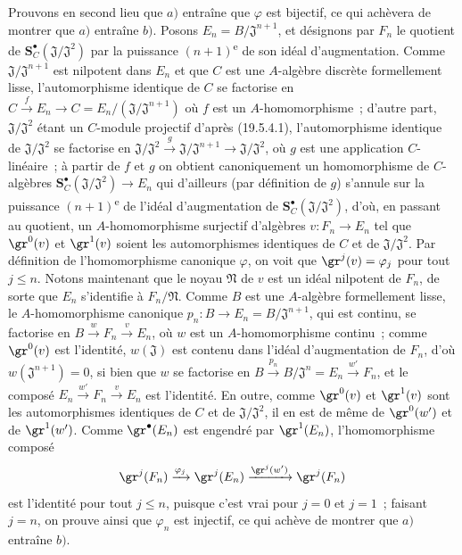\begin{env}[19.5.4.2]
\label{0.19.5.4.2-fr}
Prouvons en second lieu que $a)$ entraîne que $\varphi$ est bijectif, ce qui
achèvera de montrer que $a)$ entraîne $b)$. Posons
$E_n=B/\mathfrak J^{n+1}$, et désignons par $F_n$ le quotient de
$\mathbf S_C^\bullet(\mathfrak J/\mathfrak J^2)$ par la puissance $(n+1)$\textsuperscript{e} de
son idéal d'augmentation. Comme $\mathfrak J/\mathfrak J^{n+1}$ est nilpotent
dans $E_n$ et que $C$ est une $A$-algèbre discrète formellement lisse,
l'automorphisme identique de $C$ se factorise en
$C\xrightarrow{f}E_n\to C=E_n/(\mathfrak J/\mathfrak J^{n+1})$ où $f$ est un
$A$-homomorphisme~; d'autre part, $\mathfrak J/\mathfrak J^2$ étant un
$C$-module projectif d'après (19.5.4.1), l'automorphisme identique de
$\mathfrak J/\mathfrak J^2$ se factorise en
$\mathfrak J/\mathfrak J^2\xrightarrow{g}\mathfrak J/\mathfrak J^{n+1}
\to\mathfrak J/\mathfrak J^2$, où $g$ est une application $C$-linéaire~; à
partir de $f$ et $g$ on obtient canoniquement un homomorphisme de $C$-algèbres
$\mathbf S_C^\bullet(\mathfrak J/\mathfrak J^2)\to E_n$ qui d'ailleurs (par
définition de $g$) s'annule sur la puissance $(n+1)$\textsuperscript{e} de l'idéal
d'augmentation de $\mathbf S_C^\bullet(\mathfrak J/\mathfrak J^2)$, d'où, en
passant au quotient, un $A$-homomorphisme surjectif d'algèbres
$v:F_n\to E_n$ tel que $\gr^0(v)$ et $\gr^1(v)$ soient les automorphismes
identiques de $C$ et de $\mathfrak J/\mathfrak J^2$. Par définition de
l'homomorphisme canonique $\varphi$, on voit que $\gr^j(v)=\varphi_j$ pour tout
$j\leq n$. Notons maintenant que le noyau $\mathfrak N$ de $v$ est un idéal
nilpotent de $F_n$, de sorte que $E_n$ s'identifie à $F_n/\mathfrak N$. Comme
$B$ est une $A$-algèbre formellement lisse, le $A$-homomorphisme canonique
$p_n:B\to E_n=B/\mathfrak J^{n+1}$, qui est continu, se factorise en
$B\xrightarrow{w}F_n\xrightarrow{v}E_n$, où $w$ est un $A$-homomorphisme
continu~; comme $\gr^0(v)$ est l'identité, $w(\mathfrak J)$ est contenu dans
l'idéal d'augmentation de $F_n$, d'où $w(\mathfrak J^{n+1})=0$, si bien que
$w$ se factorise en
$B\xrightarrow{p_n}B/\mathfrak J^n=E_n\xrightarrow{w'}F_n$, et le composé
$E_n\xrightarrow{w'}F_n\xrightarrow{v}E_n$ est l'identité. En outre, comme
$\gr^0(v)$ et $\gr^1(v)$ sont les automorphismes identiques de $C$ et de
$\mathfrak J/\mathfrak J^2$, il en est de même de $\gr^0(w')$ et de
$\gr^1(w')$. Comme $\gr^\bullet(E_n)$ est engendré par $\gr^1(E_n)$,
l'homomorphisme composé
\[
  \gr^j(F_n)\xrightarrow{\varphi_j}\gr^j(E_n)
  \xrightarrow{\gr^j(w')}\gr^j(F_n)
\]
est l'identité pour tout $j\leq n$, puisque c'est vrai pour $j=0$ et $j=1$~;
faisant $j=n$, on prouve ainsi que $\varphi_n$ est injectif, ce qui achève de
montrer que $a)$ entraîne $b)$.
\end{env}

